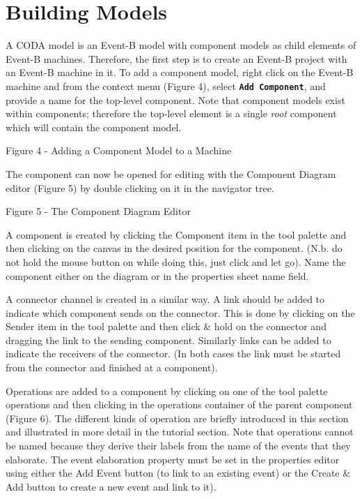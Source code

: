 \section{Building Models}
\label{sec:component_diagrams-buildingModels}

A CODA model is an Event-B model with component models as child elements of Event-B machines. Therefore, the first step is to create an Event-B project with an Event-B machine in it. To add a component model, right click on the Event-B machine and from the context menu (Figure 4), select \textbf{\texttt{Add Component}}, and provide a name for the top-level component. Note that component models exist within components; therefore the top-level element is a single \emph{root} component which will contain the component model.
 


Figure 4 - Adding a Component Model to a Machine


The component can now be opened for editing with the Component Diagram editor (Figure 5) by double clicking on it in the navigator tree.
 

Figure 5 - The Component Diagram Editor


A component is created by clicking the Component item in the tool palette and then clicking on the canvas in the desired position for the component. (N.b. do not hold the mouse button on while doing this, just click and let go). Name the component either on the diagram or in the properties sheet name field.


A connector channel is created in a similar way. A link should be added to indicate which component sends on the connector. This is done by clicking on the Sender item in the tool palette and then click \& hold on the connector and dragging the link to the sending component. Similarly links can be added to indicate the receivers of the connector. (In both cases the link must be started from the connector and finished at a component).


Operations are added to a component by clicking on one of the tool palette operations and then clicking in the operations container of the parent component (Figure 6). The different kinds of operation are briefly introduced in this section and illustrated in more detail in the tutorial section. Note that operations cannot be named because they derive their labels from the name of the events that they elaborate. The event elaboration property must be set in the properties editor using either the Add Event button (to link to an existing event) or the Create \& Add button to create a new event and link to it).


